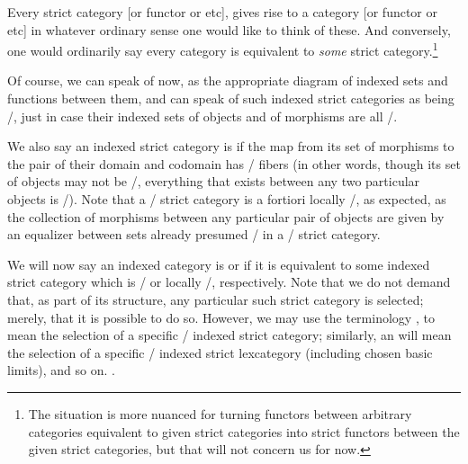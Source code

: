 Every strict category [or functor or etc], gives rise to a category [or functor or etc] in whatever ordinary sense one would like to think of these. And conversely, one would ordinarily say every category is equivalent to \emph{some} strict category.\footnote{The situation is more nuanced for turning functors between arbitrary categories equivalent to given strict categories into strict functors between the given strict categories, but that will not concern us for now.}

\begin{definition}
Of course, we can speak of  now, as the appropriate diagram of indexed sets and functions between them, and can speak of such indexed strict categories as being \repsmall/, just in case their indexed sets of objects and of morphisms are all \repsmall/.
\end{definition}

\begin{definition}
We also say an indexed strict category is  if the map from its set of morphisms to the pair of their domain and codomain has \repsmall/ fibers (in other words, though its set of objects may not be \repsmall/, everything that exists between any two particular objects is \repsmall/). Note that a \repsmall/ strict category is a fortiori locally \repsmall/, as expected, as the collection of morphisms between any particular pair of objects are given by an equalizer between sets already presumed \repsmall/ in a \repsmall/ strict category.
\end{definition}

\begin{definition}
We will now say an indexed category is  or  if it is equivalent to some indexed strict category which is \repsmall/ or locally \repsmall/, respectively. Note that we do not demand that, as part of its structure, any particular such strict category is selected; merely, that it is possible to do so. However, we may use the terminology , to mean the selection of a specific \repsmall/ indexed strict category; similarly, an  will mean the selection of a specific \repsmall/ indexed strict lexcategory (including chosen basic limits), and so on. .
\end{definition}

